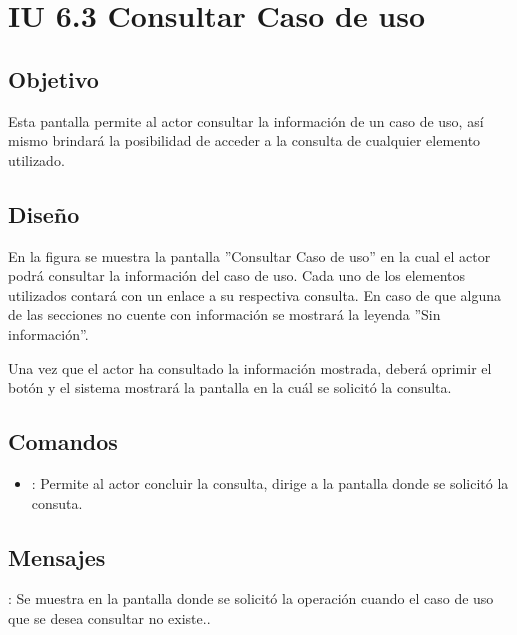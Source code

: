 \section{IU 6.3 Consultar Caso de uso}

\subsection{Objetivo}
	Esta pantalla permite al actor consultar la información de un caso de uso, así mismo brindará la posibilidad de acceder a la consulta de cualquier elemento utilizado.
\subsection{Diseño}
	En la figura  se muestra la pantalla ''Consultar Caso de uso'' en la cual el actor podrá consultar la información del caso de uso. Cada uno de los elementos utilizados contará con un enlace a su respectiva consulta. En caso de que alguna de las secciones no cuente con información se mostrará la leyenda ''Sin información''.

Una vez que el actor ha consultado la información mostrada, deberá oprimir el botón  y el sistema mostrará la pantalla en la cuál se solicitó la consulta.

\subsection{Comandos}
\begin{itemize}
	\item {}: Permite al actor concluir la consulta, dirige a la pantalla donde se solicitó la consuta.
\end{itemize}

\subsection{Mensajes}

\begin{Citemize}
	\item {}: Se muestra en la pantalla donde se solicitó la operación cuando el caso de uso que se desea consultar no existe..
\end{Citemize}
